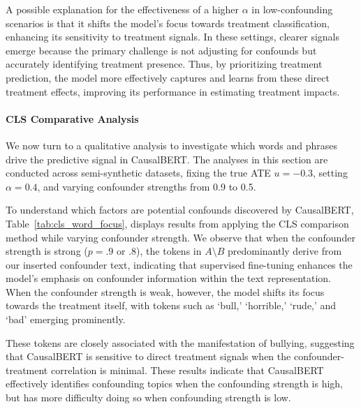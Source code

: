 \documentclass[11pt]{article}
\begin{document}
A possible explanation for the effectiveness of a higher \(\alpha\) in low-confounding scenarios is that it shifts the model’s focus towards treatment classification, enhancing its sensitivity to treatment signals. In these settings, clearer signals emerge because the primary challenge is not adjusting for confounds but accurately identifying treatment presence. Thus, by prioritizing treatment prediction, the model more effectively captures and learns from these direct treatment effects, improving its performance in estimating treatment impacts.





\paragraph{CLS Comparative Analysis} 
We now turn to a qualitative analysis to investigate which words and phrases drive the predictive signal in CausalBERT. The analyses in this section are conducted across semi-synthetic datasets, fixing the true ATE \(u=-0.3\), setting $\alpha=0.4$, and varying confounder strengths from 0.9 to 0.5.


To understand which factors are potential confounds discovered by CausalBERT, Table~\ref{tab:cls_word_focus}, displays results from applying the CLS comparison method while varying confounder strength. We observe that when the confounder strength is strong  ($p=.9$ or $.8$), the tokens in \(A \setminus B\) predominantly derive from our inserted confounder text, indicating that supervised fine-tuning enhances the model’s emphasis on confounder information within the text representation. When the confounder strength is weak, however, the model shifts its focus towards the treatment itself, with tokens such as `bull,' `horrible,' `rude,' and `bad' emerging prominently. 

These tokens are closely associated with the manifestation of bullying, suggesting that CausalBERT is sensitive to direct treatment signals when the confounder-treatment correlation is minimal. These results indicate that CausalBERT effectively identifies confounding topics when the confounding strength is high, but has more difficulty doing so when confounding strength is low.
\end{document}
